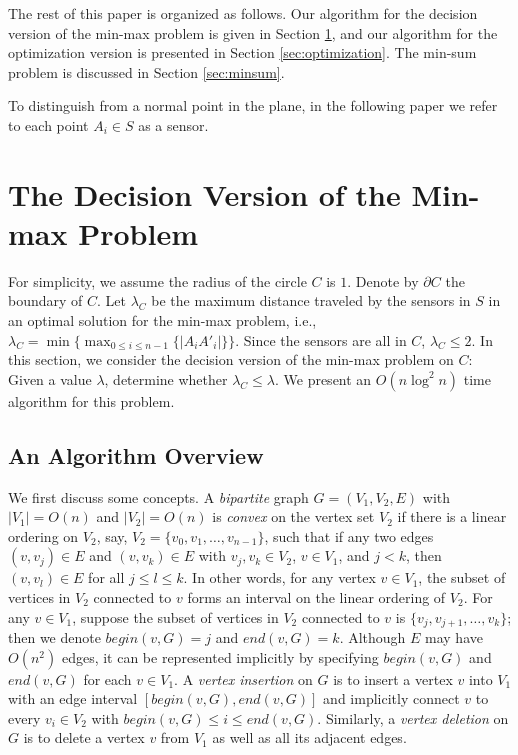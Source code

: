 \documentclass[11pt]{article}
\begin{document}
The rest of this paper is organized as follows. Our algorithm for the
decision version of the min-max problem is given in Section
\ref{sec:decision}, and our algorithm for the optimization version
is presented in Section \ref{sec:optimization}. The min-sum problem
is discussed in Section \ref{sec:minsum}.

To distinguish from a normal point in the plane, in the following
paper we refer to each
point $A_i\in S$ as a sensor.

\section{The Decision Version of the Min-max Problem}
\label{sec:decision}

For simplicity, we assume the radius of the circle $C$ is $1$. Denote by
$\partial C$ the boundary of $C$. Let $\lambda_C$ be the
maximum distance traveled by the sensors in $S$ in an optimal solution for
the min-max problem, i.e., $\lambda_C =\min \{\max_{0\leq i\leq n-1}
\{|A_{i} A'_{i}| \}\}$. Since the sensors are all in $C$, $\lambda_C \leq 2$.
In this section, we consider the decision version of the min-max
problem on $C$: Given a value $\lambda$, determine whether $\lambda_C\leq
\lambda$. We present an $O(n\log^2 n)$ time algorithm for this problem.

\subsection{An Algorithm Overview}

We first discuss some concepts. A
{\it bipartite} graph $G = (V_1, V_2, E)$ with $|V_1|=O(n)$ and $|V_2|=O(n)$ is
{\it convex} on the vertex set $V_2$ if there is a linear ordering
on $V_2$, say, $V_2=\{v_0,v_1,\ldots,v_{n-1}\}$, such that if any two
edges $(v, v_j) \in E$ and $(v, v_k) \in E$ with $v_j, v_k \in V_2$,
$v\in V_1$, and $j < k$, then $(v, v_l) \in E$ for all $j \leq l
\leq k$. In other words, for any vertex $v\in V_1$, the subset of
vertices in $V_2$ connected to $v$ forms an interval on the linear
ordering of $V_2$. For any $v\in V_1$, suppose the subset of vertices
in $V_2$ connected to $v$ is $\{v_j,v_{j+1},\ldots,v_k\}$; then we denote
$begin(v,G)=j$ and $end(v,G)=k$. Although $E$ may have $O(n^2)$
edges, it can be represented implicitly by specifying $begin(v,G)$ and
$end(v,G)$ for each $v\in V_1$.  A {\em vertex insertion} on $G$ is
to insert a vertex $v$ into $V_1$ with an edge interval
$[begin(v,G),end(v,G)]$ and implicitly connect $v$ to every $v_i\in
V_2$ with $begin(v,G)\leq i\leq end(v,G)$. Similarly, a {\em vertex
deletion} on $G$ is to delete a vertex $v$ from $V_1$ as well as all its
adjacent edges.
\end{document}
